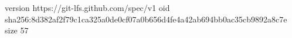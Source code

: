 version https://git-lfs.github.com/spec/v1
oid sha256:8d382af2f79c1ca325a0de0cf07a0b656d4fe4a42ab694bb0ac35cb9892a8c7e
size 57
